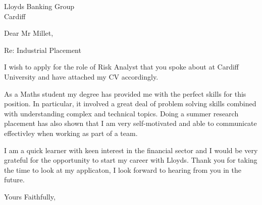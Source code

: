 \documentclass[12pt]{letter}
\begin{document}
\begin{letter}
{Lloyds Banking Group \\ Cardiff}
\opening{Dear Mr Millet,}

Re: Industrial Placement

I wish to apply for the role of Risk Analyst that you spoke about at Cardiff University and have attached my CV accordingly.

As a Maths student my degree has provided me with the perfect skills for this position.
In particular, it involved a great deal of problem solving skills combined with understanding complex and technical topics.
Doing a summer research placement has also shown that I am very self-motivated and able to communicate effectivley when working as part of a team.

I am a quick learner with keen interest in the financial sector and I would be very grateful for the opportunity to start my career with Lloyds. Thank you for taking the time to look at my applicaton, I look forward to hearing from you in the future.

\closing{Yours Faithfully,}


\end{letter}
\end{document}
